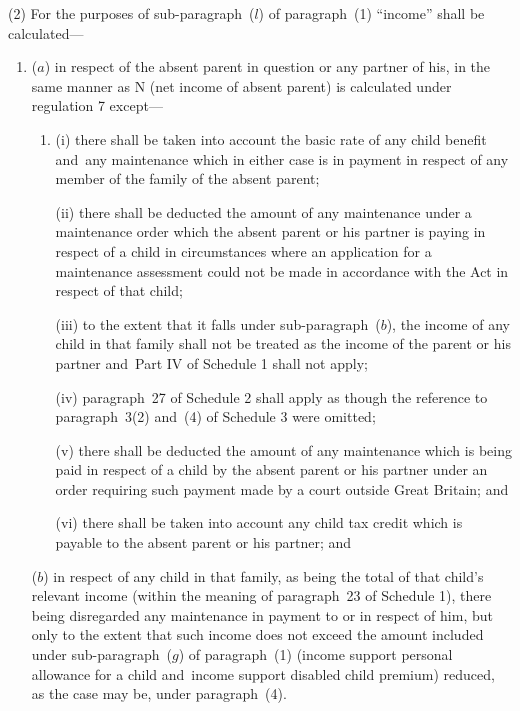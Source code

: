 \documentclass[12pt,a4paper]{article}
\begin{document}
(2) For the purposes of sub-paragraph~($l$) of paragraph~(1) “income” shall be calculated—
\begin{enumerate}\item[]
($a$) in respect of the absent parent in question or any partner of his, in the same manner as N (net income of absent parent) is calculated under regulation 7 except—
\begin{enumerate}\item[]
(i) there shall be taken into account the basic rate of any child benefit and~any maintenance which in either case is in payment in respect of any member of the family of the absent parent;

(ii) there shall be deducted the amount of any maintenance under a maintenance order which the absent parent or his partner is paying in respect of a child in circumstances where an application for a maintenance assessment could not be made in accordance with the Act in respect of that child; 

(iii) to the extent that it falls under sub-paragraph~($b$), the income of any child in that family shall not be treated as the income of the parent or his partner and~Part IV of Schedule 1 shall not apply; 

(iv) paragraph~27 of Schedule 2 shall apply as though the reference to paragraph~3(2) and~(4) of Schedule 3 were omitted;

(v) there shall be deducted the amount of any maintenance which is being paid in respect of a child by the absent parent or his partner under an order requiring such payment made by a court outside Great Britain; and

(vi) there shall be taken into account any child tax credit which is payable to the absent parent or his partner; and
\end{enumerate}

($b$) in respect of any child in that family, as being the total of 
that child’s relevant income (within the meaning of paragraph~23 of Schedule 1), there being disregarded any maintenance in payment to or in respect of him,  %
but only to the extent that such income does not exceed the amount included under sub-paragraph~($g$) of paragraph~(1) (income support personal allowance for a child and~income support disabled child premium) reduced, as the case may be, under paragraph~(4).
\end{enumerate}
\end{document}
